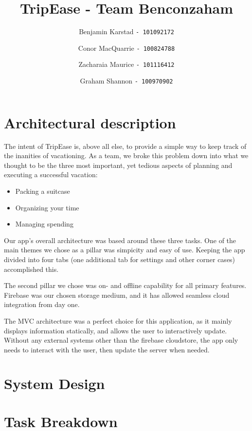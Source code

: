 \documentclass[12pt]{article}
\title{TripEase - Team Benconzaham}
\author{
Benjamin Karstad
\texttt{- 101092172}
\and
Conor MacQuarrie
\texttt{- 100824788}
\and
Zacharaia Maurice
\texttt{- 101116412}
\and
Graham Shannon
\texttt{- 100970902}
}
\begin{document}
	\maketitle
	\pagebreak
	\section*{Architectural description}
		The intent of TripEase is, above all else, to provide a simple way to keep track of the inanities of vacationing.
		As a team, we broke this problem down into what we thought to be the three most important,
		yet tedious aspects of planning and executing a successful vacation:
		\begin{itemize}
			\item Packing a suitcase
			\item Organizing your time
			\item Managing spending
		\end{itemize}
		Our app's overall architecture was based around these three tasks.
		One of the main themes we chose as a pillar was simpicity and easy of use.
		Keeping the app divided into four tabs (one additional tab for settings and other corner cases) accomplished this.

		The second pillar we chose was on- and offline capability for all primary features.
		Firebase was our chosen storage medium, and it has allowed seamless cloud integration from day one.

		The MVC architecture was a perfect choice for this application, as it mainly displays information statically,
		and allows the user to interactively update.
		Without any external systems other than the firebase cloudstore, the app only needs to interact with the user,
		then update the server when needed.



	\pagebreak
	\section*{System Design}
	\pagebreak
	\section*{Task Breakdown}
\end{document}
